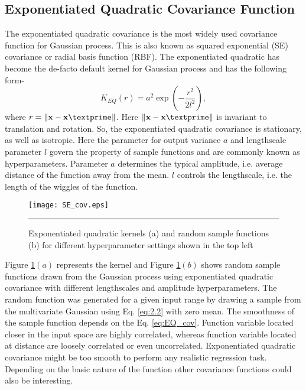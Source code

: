 \subsection{Exponentiated Quadratic Covariance Function}
The exponentiated quadratic covariance is the most widely used covariance function for Gaussian process. This is also known as squared exponential (SE) covariance or radial basis function (RBF). The exponentiated quadratic has become the de-facto default kernel for Gaussian process and has the following form-
\begin{equation} \label{eq:EQ_cov}
K_{EQ}(r)= a^2 \exp \left(-\frac{r^2}{2l^2}\right),
\end{equation}
where $r=\lVert \textbf{x}-\textbf{x}\textprime \rVert$. Here $\lVert \textbf{x}-\textbf{x}\textprime \rVert$ is invariant to translation and rotation. So, the exponentiated quadratic covariance is stationary, as well as isotropic. Here the parameter for output variance $a$ and lengthscale parameter $l$ govern the property of sample functions and are commonly known as hyperparameters. Parameter $a$ determines the typical amplitude, i.e. average distance of the function away from the mean. $l$ controls the lengthscale, i.e. the length of the wiggles of the function. 
\begin{figure}[t]
	\centering
		\texttt{[image: SE\_cov.eps]}
		\rule{35em}{0.5pt}
	\caption[Exponentiated quadratic kernels and sample functions]
		{Exponentiated quadratic kernels (a) and random sample functions (b) for different hyperparameter settings shown in the top left}
	\label{fig:Exponentiated_Quadratic_covariance}
\end{figure}
Figure \ref{fig:Exponentiated_Quadratic_covariance}$(a)$ represents the kernel and Figure \ref{fig:Exponentiated_Quadratic_covariance}$(b)$ shows random sample functions drawn from the Gaussian process using exponentiated quadratic covariance with different lengthscales and amplitude hyperparameters. The random function was generated for a given input range by drawing a sample from the multivariate Gaussian using Eq. \ref{eq:2.2} with zero mean. The smoothness of the sample function depends on the Eq. \ref{eq:EQ_cov}. Function variable located closer in the input space are highly correlated, whereas function variable located at distance are loosely correlated or even uncorrelated. Exponentiated quadratic covariance might be too smooth to perform any realistic regression task. Depending on the basic nature of the function other covariance functions could also be interesting.

